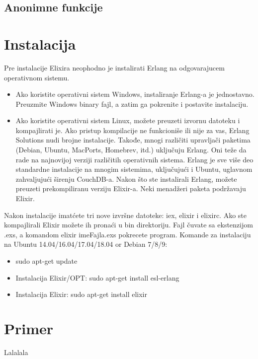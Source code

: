 \documentclass[a4paper]{article}
\begin{document}
\subsection{Anonimne funkcije}
\label{sec:ime}

\section{Instalacija}
Pre instalacije Elixira neophodno je instalirati Erlang na odgovarajucem operativnom sistemu.
\begin{itemize}
    \item Ako koristite operativni sistem Windows, instaliranje Erlang-a je jednostavno. Preuzmite Windows binary fajl, a zatim ga pokrenite i postavite instalaciju. 
    \item Ako koristite operativni sistem Linux, možete preuzeti izvornu datoteku i kompajlirati je. Ako pristup kompilacije ne funkcioniše ili nije za vas, Erlang Solutions nudi brojne instalacije. Takođe, mnogi različiti upravljači paketima (Debian, Ubuntu, MacPorts, Homebrev, itd.) uključuju Erlang.  Oni teže da rade na najnovijoj verziji različitih operativnih sistema. Erlang je sve više deo standardne instalacije na mnogim sistemima, uključujući i Ubuntu, uglavnom zahvaljujući širenju CouchDB-a. Nakon što ste instalirali Erlang, možete preuzeti prekompiliranu verziju Elixir-a. Neki menadžeri paketa podržavaju Elixir.
\end{itemize}
Nakon instalacije imatćete tri nove izvršne datoteke: iex, elixir i elixirc. Ako ste kompajlirali Elixir možete ih pronaći u bin direktoriju. 
Fajl čuvate sa ekstenzijom .exs, a komandom elixir imeFajla.exs pokrecete program.
Komande za instalaciju na Ubuntu 14.04/16.04/17.04/18.04 or Debian 7/8/9:
\begin{itemize}
    \item sudo apt-get update
    \item Instalacija Elixir/OPT: sudo apt-get install esl-erlang
    \item Instalacija Elixir: sudo apt-get install elixir
\end{itemize}

\section{Primer}
Lalalala
\end{document}
